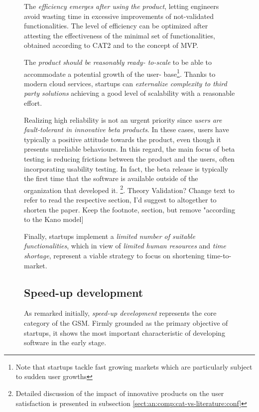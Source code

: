 \documentclass[12pt,journal,compsoc]{../sty/IEEEtran}
\begin{document}
\begin{table}[!t]
\begin{figure}[!t]
\begin{compactitem}
\item The \textit{efficiency emerges after using the product}, letting
engineers avoid wasting time in excessive improvements of not-validated
functionalities. The level of efficiency can be optimized after attesting the
effectiveness of the minimal set of functionalities, obtained according to CAT2
and to the concept of MVP. \item The \textit{product should be reasonably ready-
to-scale} to be able to  accommodate a potential growth of the user-
base\footnote{Note that startups  tackle fast growing markets which are
particularly subject to sudden user  growths}. Thanks to modern cloud services,
startups can \textit{externalize  complexity to third party solutions} achieving
a good level of scalability with  a reasonable effort. \item Realizing high
reliability is not an urgent priority since \textit{users  are fault-tolerant in
innovative beta products}. In these cases, users have  typically a positive
attitude towards the product, even though it presents  unreliable behaviours. In
this regard, the main focus of beta testing is  reducing frictions between the
product and the users, often incorporating  usability testing. In fact, the beta
release is typically the first time that  the software is available outside of
the organization that developed it.  \footnote{Detailed discussion of the impact
of innovative products on the user  satisfaction is presented in subsection
\ref{sect:an:comp:cat-vs-literature:conf}}. %
Theory Validation? Change text to refer to  %
read the respective section, I'd suggest to  %
altogether to shorten the paper. Keep the footnote,  %
section, but remove "according to the Kano model] %


Finally, startups implement a \textit{limited number of suitable
functionalities}, which in view of \textit{limited human resources} and
\textit{time shortage}, represent a viable strategy to focus on shortening
time-to-market.
\subsection{Speed-up development} \label{res:gsm:cat1} As remarked initially,
\textit{speed-up development} represents the core  category of the GSM. Firmly
grounded as the primary objective of startups, it  shows the most important
characteristic of developing software in the early  stage.



\end{compactitem}
\end{figure}
\end{table}
\end{document}
